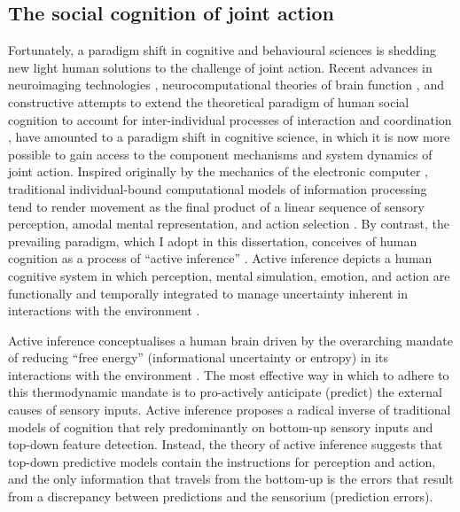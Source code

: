 \begin{CJK}{UTF8}{gbsn}
\section{The social cognition of joint action}
Fortunately, a paradigm shift in cognitive and behavioural sciences is shedding new light human solutions to the challenge of joint action.  Recent advances in neuroimaging technologies \citep{Frith2007}, neurocomputational theories of brain function \citep{Friston2010,Frith2010,Yufik2013,Clark2013}, and constructive attempts to extend the theoretical paradigm of human social cognition to account for inter-individual processes of interaction and coordination \citep{Sebanz2006,Dale2014}, have amounted to a paradigm shift in cognitive science, in which it is now more possible to gain access to the component mechanisms and system dynamics of joint action.  Inspired originally by the mechanics of the electronic computer \citep{Liu2010a}, traditional individual-bound computational models of information processing tend to render movement as the final product of a linear sequence of sensory perception, amodal mental representation, and action selection \citep{Lewis2005}.  By contrast, the prevailing paradigm, which I adopt in this dissertation, conceives of human cognition as a process of ``active inference'' \citep{Friston2010}.  Active inference depicts a human cognitive system in which perception, mental simulation, emotion, and action are functionally and temporally integrated to manage uncertainty inherent in interactions with the environment \citep{Clark2013}.

Active inference conceptualises a human brain driven by the overarching mandate of reducing ``free energy'' (informational uncertainty or entropy) in its interactions with the environment \citep{Friston2010}.  The most effective way in which to adhere to this thermodynamic mandate is to pro-actively anticipate (predict) the external causes of sensory inputs.  Active inference \citep[and the predictive coding paradigm on which it extends, see][]{Clark2013} proposes a radical inverse of traditional models of cognition that rely predominantly on bottom-up sensory inputs and top-down feature detection. Instead, the theory of active inference suggests that top-down predictive models contain the instructions for perception and action, and the only information that travels from the bottom-up is the errors that result from a discrepancy between predictions and the sensorium (prediction errors).


\end{CJK}
